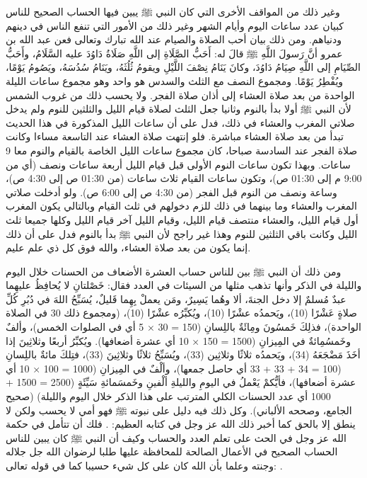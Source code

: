 وغير ذلك من المواقف الأخرى التي كان النبي ﷺ يبين فيها الحساب الصحيح للناس كبيان عدد ساعات اليوم وأيام الشهر وغير ذلك من الأمور التي تنفع الناس في دينهم ودنياهم. ومن ذلك بيان أحب الصلاة والصيام عند الله تبارك وتعالى فعن عبد الله بن عمرو أنَّ رَسولَ اللَّهِ ﷺ قالَ له: أَحَبُّ الصَّلَاةِ إلى اللَّهِ صَلَاةُ دَاوُدَ عليه السَّلَامُ، وأَحَبُّ الصِّيَامِ إلى اللَّهِ صِيَامُ دَاوُدَ، وكانَ يَنَامُ نِصْفَ اللَّيْلِ ويقومُ ثُلُثَهُ، ويَنَامُ سُدُسَهُ، ويَصُومُ يَوْمًا، ويُفْطِرُ يَوْمًا. ومجموع النصف مع الثلث والسدس هو واحد وهو مجموع ساعات الليلة الواحدة من بعد صلاة العشاء إلى أذان صلاة الفجر. ولا يحسب ذلك من غروب الشمس لأن النبي ﷺ أولا بدأ بالنوم وثانيا جعل الثلث لصلاة قيام الليل والثلثين للنوم ولم يدخل صلاتي المغرب والعشاء في ذلك، فدل على أن ساعات الليل المذكورة في هذا الحديث تبدأ من بعد صلاة العشاء مباشرة. فلو إنتهت صلاة العشاء عند التاسعة مساءا وكانت صلاة الفجر عند السادسة صباحا، كان مجموع ساعات الليل الخاصة بالقيام والنوم معا 9 ساعات. وبهذا تكون ساعات النوم الأولى قبل قيام الليل أربعة ساعات ونصف (أي من 9:00 م إلى 01:30 ص)، وتكون ساعات القيام ثلاث ساعات (من 01:30 ص إلى 4:30 ص)، وساعة ونصف من النوم قبل الفجر (من 4:30 ص إلى 6:00 ص). ولو أدخلت صلاتي المغرب والعشاء وما بينهما في ذلك للزم دخولهم في ثلث القيام وبالتالي يكون المغرب أول قيام الليل، والعشاء منتصف قيام الليل، وقيام الليل آخر قيام الليل وكلها جميعا ثلث الليل وكانت باقي الثلثين للنوم وهذا غير راجح لأن النبي ﷺ بدأ بالنوم فدل على أن ذلك إنما يكون من بعد صلاة العشاء، والله فوق كل ذي علم عليم.

ومن ذلك أن النبي ﷺ  بين للناس حساب العشرة الأضعاف من الحسنات خلال اليوم والليلة في الذكر وأنها تذهب مثلها من السيئات في العدد فقال: خَصْلتانِ لا يُحافِظُ عليهِما عبدٌ مُسلمٌ إلا دخل الجنةَ، ألا وهُما يَسِيرٌ، ومَن يعملْ بِهِما قَليلٌ، يُسَبِّحُ اللهَ في دُبُرِ كُلِّ صلاةٍ عَشْرًا (10)، ويَحمدُه عشْرًا (10)، ويُكبِّرُه عشْرًا (10)، (ومجموع ذلك 30 في الصلاة الواحدة)، فذلِكَ خَمسُونَ ومِائَةٌ باللِسانِ (150 = 30 × 5 أي في الصلوات الخمس)، وألفٌ وخَمسُمِائةٌ في المِيزانِ (1500 = 150 × 10 أي عشرة أضعافها). ويُكبِّرُ أربعًا وثلاثِينَ إذا أخَذَ مَضْجَعَهُ (34)، ويَحمدُه ثلاثًا وثلاثِين (33)، ويُسَبِّحُ ثلاثًا وثلاثِينَ (33)، فتِلكَ مائةٌ باللِسانِ (100 = 34 + 33 + 33 أي حاصل جمعها)، وألْفٌ في المِيزانِ (1000 = 100 × 10 أي عشرة أضعافها)، فأيُّكمْ يَعْملُ في اليومِ والليلةِ ألْفينِ وخَمسَمائةِ سَيِّئَةٍ (2500 = 1500 + 1000 أي عدد الحسنات الكلي المترتب على هذا الذكر خلال اليوم والليلة) {\footnotesize (صحيح الجامع، وصححه الألباني)}. وكل ذلك فيه دليل على نبوته ﷺ فهو أمي لا يحسب ولكن لا ينطق إلا بالحق كما أخبر ذلك الله عز وجل في كتابه العظيم:
\quranayah*[53][3-4]{\footnotesize \surahname*[53]}. فلك أن تتأمل في حكمة الله عز وجل في الحث على تعلم العدد والحساب وكيف أن النبي ﷺ كان يبين للناس الحساب الصحيح في الأعمال الصالحة للمحافظة عليها طلبا لرضوان الله جل جلاله وجنته وعلما بأن الله كان على كل شيء حسيبا كما في قوله تعالى: \quranayah*[4][86-87]{\footnotesize \surahname*[4]}.


